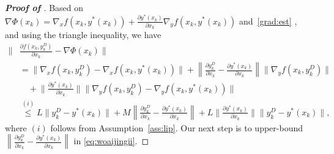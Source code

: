 \documentclass{osudissert96}
\begin{document}
\begin{proof}[\bf Proof of ]
Based on $\nabla \Phi(x_k)= \nabla_x f(x_k,y^*(x_k)) + \frac{\partial y^*(x_k)}{\partial x_k}\nabla_y f(x_k,y^*(x_k))$ and~\cref{grad:est} , and using the triangle inequality, we have 
 \begin{align}\label{eq:woaijingii}
\Big\|&\frac{\partial f(x_k,y^D_k)}{\partial x_k} -\nabla\Phi(x_k)\Big\| \nonumber
\\&=\| \nabla_x f(x_k,y_k^D)-\nabla_x f(x_k,y^*(x_k))\| + \left\|\frac{\partial y_k^D}{\partial x_k}-\frac{\partial y^*(x_k)}{\partial x_k}\right\|\|\nabla_y f(x_k,y_k^D)\| \nonumber
\\&\quad+\Big\|\frac{\partial y^*(x_k)}{\partial x_k}\Big\|\big\|\nabla_y f(x_k,y_k^D)-\nabla_y f(x_k,y^*(x_k))\big\|\nonumber
\\&\overset{(i)}\leq L\|y_k^D-y^*(x_k)\| + M \left\|\frac{\partial y_k^D}{\partial x_k}-\frac{\partial y^*(x_k)}{\partial x_k}\right\| + L\Big\|\frac{\partial y^*(x_k)}{\partial x_k}\Big\|\|y_k^D-y^*(x_k)\|, 
\end{align}
where $(i)$ follows from Assumption~\ref{ass:lip}. Our next step is to upper-bound $\left\|\frac{\partial y_k^D}{\partial x_k}-\frac{\partial y^*(x_k)}{\partial x_k}\right\| $ in \cref{eq:woaijingii}.



\end{proof}
\end{document}
